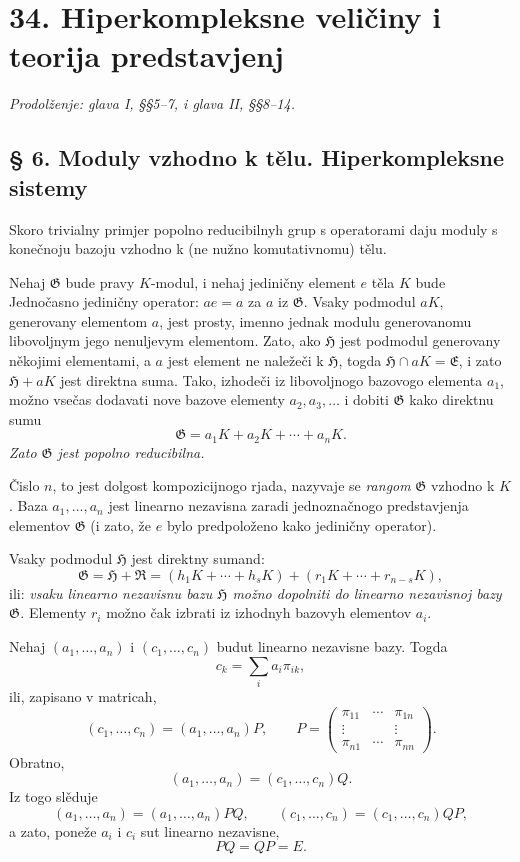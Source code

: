 \documentclass[11pt]{article}
\providecommand{\mG}{\mathfrak{G}}
\providecommand{\mE}{\mathfrak{E}}
\providecommand{\mH}{\mathfrak{H}}
\providecommand{\mR}{\mathfrak{R}}
\begin{document}
\setcounter{footnote}{11}
\section*{34. Hiperkompleksne veličiny i teorija predstavjenj}
\emph{Prodolženje: glava I, §§5--7, i glava II, §§8--14.}

\subsection*{§ 6. Moduly vzhodno k tělu. Hiperkompleksne sistemy}

Skoro trivialny primjer popolno reducibilnyh grup s operatorami daju moduly s konečnoju bazoju vzhodno k (ne nužno komutativnomu) tělu.

Nehaj $\mG$ bude pravy $K$-modul, i nehaj jediničny element $e$ těla $K$ bude Jednočasno jediničny operator: $ae=a$ za $a$ iz $\mG$. Vsaky podmodul $aK$, generovany elementom $a$, jest prosty, imenno jednak modulu generovanomu libovoljnym jego nenuljevym elementom. Zato, ako $\mH$ jest podmodul generovany někojimi elementami, a $a$ jest element ne naležeči k $\mH$, togda $\mH\cap aK=\mE$, i zato $\mH+aK$ jest direktna suma. Tako, izhodeči iz libovoljnogo bazovogo elementa $a_1$, možno vsečas dodavati nove bazove elementy $a_2,a_3,\ldots$ i dobiti $\mG$ kako direktnu sumu
\[
        \mG=a_1K+a_2K+\cdots+a_nK.
\]
\emph{Zato $\mG$ jest popolno reducibilna.}

Čislo $n$, to jest dolgost kompozicijnogo rjada, nazyvaje se \emph{rangom} $\mG$ vzhodno k $K$. Baza $a_1,\ldots,a_n$ jest linearno nezavisna zaradi jednoznačnogo predstavjenja elementov $\mG$ (i zato, že $e$ bylo predpoloženo kako jediničny operator).

Vsaky podmodul $\mH$ jest direktny sumand:
\[
        \mG=\mH+\mR=(h_1K+\cdots+h_sK)+(r_1K+\cdots+r_{n-s}K),
\]
ili: \emph{vsaku linearno nezavisnu bazu $\mH$ možno dopolniti do linearno nezavisnoj bazy $\mG$.} Elementy $r_i$ možno čak izbrati iz izhodnyh bazovyh elementov $a_i$.

Nehaj $(a_1,\ldots,a_n)$ i $(c_1,\ldots,c_n)$ budut linearno nezavisne bazy. Togda
\[
        c_k=\sum_i a_i\pi_{ik},
\]
ili, zapisano v matricah,
\[
        (c_1,\ldots,c_n)=(a_1,\ldots,a_n)P,
        \qquad
        P=\begin{pmatrix}
        \pi_{11}&\cdots&\pi_{1n}\\
        \vdots&&\vdots\\
        \pi_{n1}&\cdots&\pi_{nn}
        \end{pmatrix}.
\]
Obratno,
\[
        (a_1,\ldots,a_n)=(c_1,\ldots,c_n)Q.
\]
Iz togo slěduje
\[
        (a_1,\ldots,a_n)=(a_1,\ldots,a_n)PQ,
        \qquad
        (c_1,\ldots,c_n)=(c_1,\ldots,c_n)QP,
\]
a zato, poneže $a_i$ i $c_i$ sut linearno nezavisne,
\[
        PQ=QP=E.
\]
\end{document}
